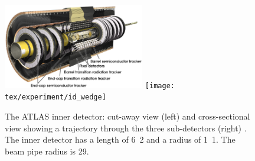 \begin{figure}
	\includegraphics[width=0.55\textwidth]{tex/experiment/id_whole}
	\hfill
	\texttt{[image: tex/experiment/id\_wedge]}
	\caption{The ATLAS inner detector: cut-away view (left) and cross-sectional view 
	showing a trajectory through the three sub-detectors (right) \cite{ATLAS-detector}. 
	The inner detector has a length of \unit{6.2}{\metre} and a radius of 
	\unit{1.1}{\metre}. The beam pipe radius is \unit{29}{\milli\metre}.}
	\label{fig:inner_detector}
\end{figure}

